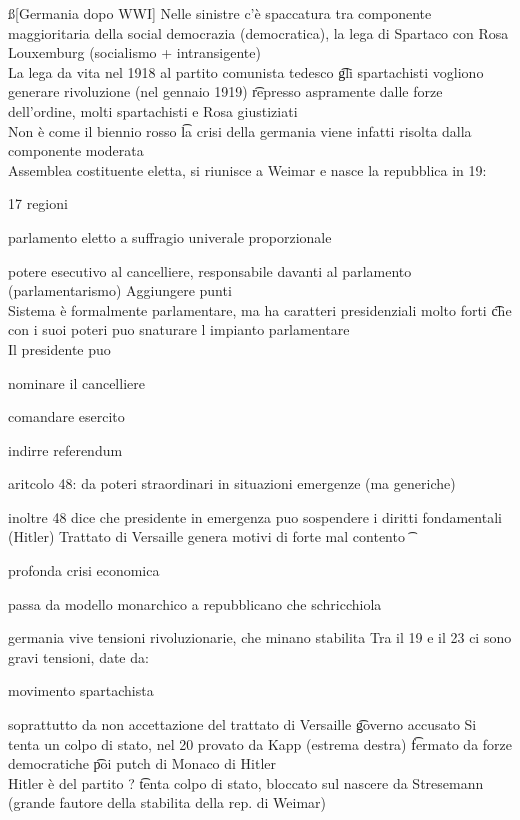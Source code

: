 \documentclass[12pt]{article}
\begin{document}
\ss[Germania dopo WWI]
Nelle sinistre c'è spaccatura tra componente maggioritaria della social democrazia (democratica), la lega di Spartaco con Rosa Louxemburg (socialismo + intransigente) \\
La lega da vita nel 1918 al partito comunista tedesco \t gli spartachisti vogliono generare rivoluzione (nel gennaio 1919) \t represso aspramente dalle forze dell'ordine, molti spartachisti e Rosa giustiziati \\
Non è come il biennio rosso \t la crisi della germania viene infatti risolta dalla componente moderata \\
Assemblea costituente eletta, si riunisce a Weimar e nasce la repubblica in 19:
\bi
\item 17 regioni
\item parlamento eletto a suffragio univerale proporzionale
\item potere esecutivo al cancelliere, responsabile davanti al parlamento (parlamentarismo)
\ei
Aggiungere punti \\
Sistema è formalmente parlamentare, ma ha caratteri presidenziali molto forti \t che con i suoi poteri puo snaturare l impianto parlamentare \\
Il presidente puo 
\bi
\item nominare il cancelliere
\item comandare esercito
\item indirre referendum
\item aritcolo 48: da poteri straordinari in situazioni emergenze (ma generiche)
\item inoltre 48 dice che presidente in emergenza puo sospendere i diritti fondamentali (Hitler)
\ei
Trattato di Versaille genera motivi di forte mal contento \t 
\bi
\item profonda crisi economica
\item passa da modello monarchico a repubblicano che schricchiola
\item germania vive tensioni rivoluzionarie, che minano stabilita
\ei
Tra il 19 e il 23 ci sono gravi tensioni, date da:
\bi
\item movimento spartachista
\item soprattutto da non accettazione del trattato di Versaille \t governo accusato
\ei
Si tenta un colpo di stato, nel 20 provato da Kapp (estrema destra) \t fermato da forze democratiche \t poi putch di Monaco di Hitler \\
Hitler è del partito ? \t tenta colpo di stato, bloccato sul nascere da Stresemann (grande fautore della stabilita della rep. di Weimar) \\
\end{document}
